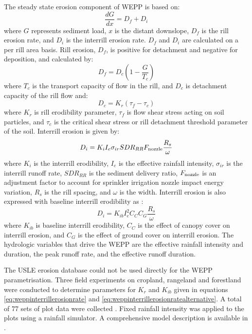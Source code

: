 The steady state erosion component of WEPP is based on:
\begin{equation}
\label{eq:weppsedimentload}
  \frac{dG}{dx} = D_f+D_i
\end{equation}
where $G$ represents sediment load, $x$ is the distant downslope, $D_f$ is the
rill erosion rate, and $D_i$ is the interrill erosion rate. $D_f$ and $D_i$ are
calculated on a per rill area basis. Rill erosion, $D_f$, is positive for
detachment and negative for deposition, and calculated by:
\begin{equation}
\label{eq:wepprillerosionrate}
  D_f=D_c(1-\frac{G}{T_c})
\end{equation}
where $T_c$ is the transport capacity of flow in the rill, and $D_c$ is
detachment capacity of the rill flow and:
\begin{equation}
\label{eq:weppdetachmentcapacity}
  D_c=K_r(\tau_f-\tau_c)
\end{equation}
where $K_r$ is rill erodibility parameter, $\tau_f$ is flow shear stress acting
on soil particles, and $\tau_c$ is the critical shear stress or rill detachment
threshold parameter of the soil.
Interrill erosion is given by:
\begin{equation}
\label{eq:weppinterrillerosionrate}
  D_i=K_i I_e \sigma_{ir} SDR_{RR} F_{\textrm{\scriptsize nozzle}}
\frac{R_s}{\omega}
\end{equation}
where $K_i$ is the interrill erodibility, $I_e$ is the effective rainfall
intensity, $\sigma_{ir}$ is the interrill runoff rate, $SDR_{RR}$ is the
sediment delivery ratio, $F_{\textrm{\scriptsize nozzle}}$ is an adjustment
factor to account for sprinkler irrigation nozzle impact energy variation, $R_s$
is the rill spacing, and $\omega$ is the width. Interrill erosion is also
expressed with baseline interrill erodibility as \citep{nicks1998-377}:
\begin{equation}
\label{eq:weppinterrillerosionratealternative}
  D_i=K_{ib} I_e^2 C_C C_G \frac{R_s}{\omega}
\end{equation}
where $K_{ib}$ is baseline interrill erodibility, $C_C$ is the effect of canopy
cover on interrill erosion, and $C_G$ is the effect of ground cover on interrill
erosion. The hydrologic variables that drive the WEPP are the effective rainfall
intensity and duration, the peak runoff rate, and the effective runoff duration.

The USLE erosion database could not be used directly for the WEPP
parametrisation. Three field experiments on cropland, rangeland and forestland
were conducted to determine parameters for $K_r$ and $K_{ib}$ given in equations
\ref{eq:weppinterrillerosionrate} and
\ref{eq:weppinterrillerosionratealternative}. A total of 77 sets of plot data
were collected \citep{nicks1998-377}. Fixed rainfall intensity was applied to
the plots using a rainfall simulator. A comprehensive model description is
available in \citet{flanagan1995-usda}.

